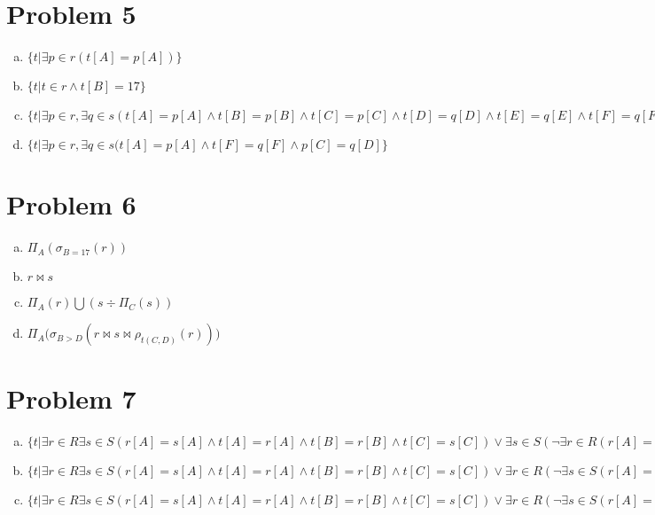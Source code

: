\documentclass[a4paper,11pt]{article}
\begin{document}
\section*{Problem 5}
\begin{enumerate}[a.]
\item $\{t|\exists p\in r (t[A]=p[A])\}$
\item $\{t|t\in r\wedge t[B]=17\}$
\item $\{t|\exists p\in r, \exists q\in s (t[A] = p[A]\wedge t[B] = p[B]\wedge t[C] = p[C]\wedge t[D] = q[D]\wedge t[E] = q[E]\wedge t[F] = q[F])\}$
\item $\{t|\exists p\in r, \exists q\in s (t[A] = p[A]\wedge t[F] = q[F]\wedge p[C] = q[D]\}$
\end{enumerate}

\section*{Problem 6}
\begin{enumerate}[a.]
\item $\Pi_A(\sigma_{B=17}(r))$
\item $r\bowtie s$
\item $\Pi_A(r)\bigcup(s\div \Pi_C(s))$
\item $\Pi_A\big(\sigma_{B>D}(r \bowtie s \bowtie \rho_{t(C,D)}(r))\big)$
\end{enumerate}

\section*{Problem 7}
\begin{enumerate}[a.]
\item
$\{t|\exists r\in R \exists s\in S(r[A]=s[A]\wedge t[A]=r[A]\wedge t[B]=r[B]\wedge t[C]=s[C])\vee \exists s\in S(\neg \exists r\in R(r[A]=s[A])\wedge t[A]=s[A]\wedge t[C]=s[C]\wedge t[B]=null)\}$
\item
$\{t|\exists r\in  R\exists s\in  S(r[A]=s[A]\wedge t[A]=r[A]\wedge t[B]=r[B]\wedge t[C]=s[C]) \vee  \exists r \in   R(\neg \exists s \in  S(r[A]=s[A])\wedge t[A]=r[A]\wedge t[B]=r[B]\wedge t[C]=null) \vee  \exists s \in   S(\neg \exists r \in  R(r[A]=s[A]) \wedge  t[A]=s[A] \wedge  t[C]=s[C] \wedge  t[B]=null)\}$
\item
$\{t|\exists r\in  R\exists s\in  S(r[A]=s[A]\wedge t[A]=r[A]\wedge t[B]=r[B]\wedge t[C]=s[C]) \vee  \exists r \in   R(\neg \exists s \in  S(r[A]=s[A]) \wedge  t[A]=r[A] \wedge  t[B]=r[B] \wedge  t[C]=null)\}$
\end{enumerate}
\end{document}
